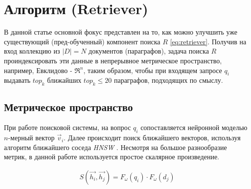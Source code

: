 
\section{Алгоритм (Retriever)}
\label{sec:retriever}

В данной статье основной фокус представлен на то, как можно улучшить уже существующий (пред-обученный) компонент поиска $R$ \eqref{eq:retriever}.
Получив на вход коллекцию из $|D|=N$ документов (параграфов), задача поиска $R$ проиндексировать эти данные в непрерывное метрическое пространство, например, Евклидово - $\Re^n$, 
таким образом, чтобы при входящем запросе $q_i$ выдавать $top_k$ ближайших $top_k\leq 20$ параграфов, подходящих по смыслу.


\subsection{Метрическое пространство}
При работе поисковой системы, на вопрос $q_i$ сопоставляется нейронной моделью $n$-мерный вектор $\vec{v}_i$.
Далее происходит поиск ближайшего векторов, используя алгоритм ближайшего соседа \textit{HNSW} \cite{enwiki:hsnw}. Несмотря на большое разнообразие метрик, в данной работе используется простое скалярное произведение.

\begin{align}
    S(\vec{h_i}, \vec{h_j})=F_{\omega}(q_i) \cdot F_{\omega}(d_j)
    \label{eq:cosine-measure}
\end{align}

